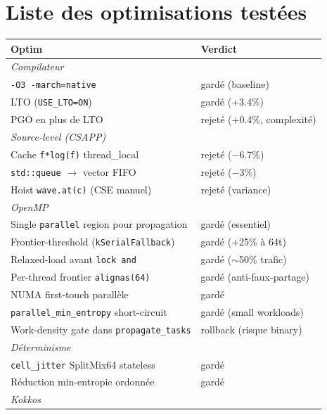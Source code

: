 \section{Liste des optimisations testées}
\label{sec:annexes:optims}

\begin{table}[H]
\centering
\small
\begin{tabularx}{\textwidth}{Xl}
\toprule
\textbf{Optim} & \textbf{Verdict} \\
\midrule
\multicolumn{2}{l}{\textit{Compilateur}} \\
\texttt{-O3 -march=native} & gardé (baseline) \\
LTO (\texttt{USE\_LTO=ON}) & gardé (+3.4\%) \\
PGO en plus de LTO & rejeté (+0.4\%, complexité) \\
\midrule
\multicolumn{2}{l}{\textit{Source-level (CSAPP)}} \\
Cache \texttt{f*log(f)} thread\_local & rejeté ($-$6.7\%) \\
\texttt{std::queue} $\to$ vector FIFO & rejeté ($-$3\%) \\
Hoist \texttt{wave.at(c)} (CSE manuel) & rejeté (variance) \\
\midrule
\multicolumn{2}{l}{\textit{OpenMP}} \\
Single \texttt{parallel} region pour propagation & gardé (essentiel) \\
Frontier-threshold (\texttt{kSerialFallback}) & gardé (+25\% à 64t) \\
Relaxed-load avant \texttt{lock and} & gardé ($\sim$50\% trafic) \\
Per-thread frontier \texttt{alignas(64)} & gardé (anti-faux-partage) \\
NUMA first-touch parallèle & gardé \\
\texttt{parallel\_min\_entropy} short-circuit & gardé (small workloads) \\
Work-density gate dans \texttt{propagate\_tasks} & rollback (risque binary) \\
\midrule
\multicolumn{2}{l}{\textit{Déterminisme}} \\
\texttt{cell\_jitter} SplitMix64 stateless & gardé \\
Réduction min-entropie ordonnée & gardé \\
\midrule
\multicolumn{2}{l}{\textit{Kokkos}} \\

\end{tabularx}
\end{table}
